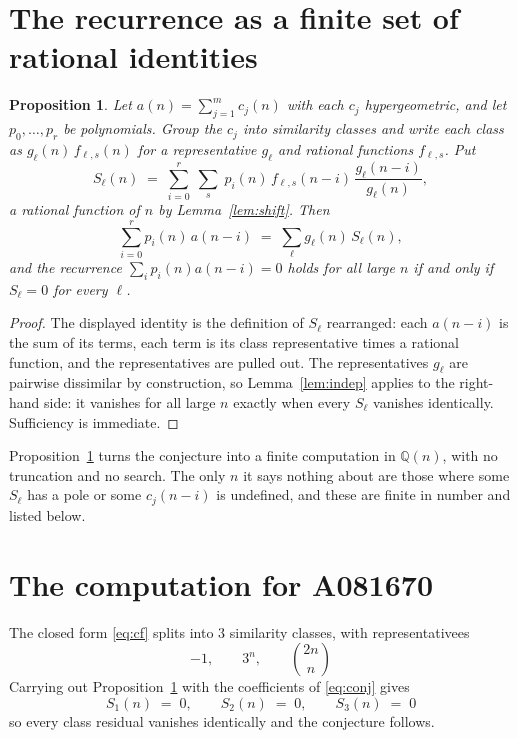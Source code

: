\documentclass[11pt,a4paper]{article}
\theoremstyle{plain}
\newtheorem{proposition}[theorem]{Proposition}
\theoremstyle{definition}
\begin{document}
\section{The recurrence as a finite set of rational identities}

\begin{proposition}\label{prop:main}
Let $a(n)=\sum_{j=1}^{m}c_{j}(n)$ with each $c_{j}$ hypergeometric, and let
$p_{0},\dots,p_{r}$ be polynomials. Group the $c_{j}$ into similarity classes and write
each class as $g_{\ell}(n)\,f_{\ell,s}(n)$ for a representative $g_{\ell}$ and rational
functions $f_{\ell,s}$. Put
\[
S_{\ell}(n)\;=\;\sum_{i=0}^{r}\;\sum_{s}\;p_{i}(n)\,f_{\ell,s}(n-i)\,
\frac{g_{\ell}(n-i)}{g_{\ell}(n)} ,
\]
a rational function of $n$ by Lemma~\ref{lem:shift}. Then
\[
\sum_{i=0}^{r}p_{i}(n)\,a(n-i)\;=\;\sum_{\ell}g_{\ell}(n)\,S_{\ell}(n),
\]
and the recurrence $\sum_{i}p_{i}(n)a(n-i)=0$ holds for all large $n$ if and only if
$S_{\ell}=0$ for every $\ell$.
\end{proposition}

\begin{proof}
The displayed identity is the definition of $S_{\ell}$ rearranged: each $a(n-i)$ is the
sum of its terms, each term is its class representative times a rational function, and the
representatives are pulled out. The representatives $g_{\ell}$ are pairwise dissimilar by
construction, so Lemma~\ref{lem:indep} applies to the right-hand side: it vanishes for all
large $n$ exactly when every $S_{\ell}$ vanishes identically. Sufficiency is immediate.
\end{proof}

Proposition~\ref{prop:main} turns the conjecture into a finite computation in
$\mathbb{Q}(n)$, with no truncation and no search. The only $n$ it says nothing about are
those where some $S_{\ell}$ has a pole or some $c_{j}(n-i)$ is undefined, and these are
finite in number and listed below.

\section{The computation for A081670}

The closed form \eqref{eq:cf} splits into 3 similarity classes, with
representativees
\[
-1,\qquad 3^{n},\qquad {\binom{2 n}{n}}
\]
Carrying out Proposition~\ref{prop:main} with the coefficients of \eqref{eq:conj} gives
\[
S_{1}(n)\;=\;0,\qquad S_{2}(n)\;=\;0,\qquad S_{3}(n)\;=\;0
\]
so every class residual vanishes identically and the conjecture follows.
\end{document}
